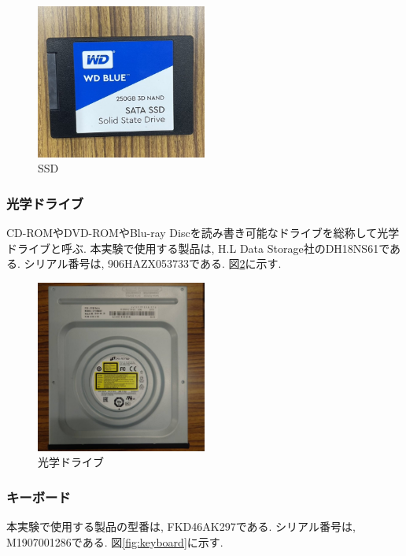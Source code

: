 \documentclass{ltjsarticle} %
\begin{document}
\begin{figure}[H] %
  \centering
  \includegraphics[width=0.5\textwidth]{ssd1.jpg} %
  \caption{SSD} %
  \label{fig:ssd1} %
\end{figure}


\subsubsection{光学ドライブ}
CD-ROMやDVD-ROMやBlu-ray Discを読み書き可能なドライブを総称して光学ドライブと呼ぶ.
本実験で使用する製品は,  H.L Data Storage社のDH18NS61である. シリアル番号は, 906HAZX053733である. 図\ref{fig:cd1}に示す. 

\begin{figure}[H] %
  \centering
  \includegraphics[width=0.5\textwidth]{cd1.jpg} %
  \caption{光学ドライブ} %
  \label{fig:cd1} %
\end{figure}


\subsubsection{キーボード}
本実験で使用する製品の型番は, FKD46AK297である. シリアル番号は, M1907001286である. 図\ref{fig:keyboard}に示す.
\end{document}
